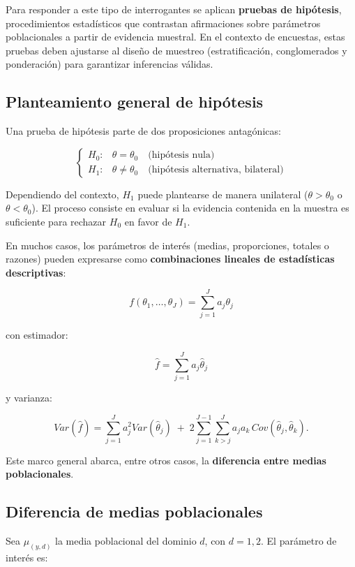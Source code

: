 \documentclass[
  spanish,
  12pt,
]{book}
\begin{document}
Para responder a este tipo de interrogantes se aplican \textbf{pruebas de hipótesis}, procedimientos estadísticos que contrastan afirmaciones sobre parámetros poblacionales a partir de evidencia muestral. En el contexto de encuestas, estas pruebas deben ajustarse al diseño de muestreo (estratificación, conglomerados y ponderación) para garantizar inferencias válidas.

\subsection{Planteamiento general de hipótesis}\label{planteamiento-general-de-hipuxf3tesis}

Una prueba de hipótesis parte de dos proposiciones antagónicas:

\[
\begin{cases}
H_{0}: & \theta = \theta_0 \quad \text{(hipótesis nula)} \\
H_{1}: & \theta \neq \theta_0 \quad \text{(hipótesis alternativa, bilateral)}
\end{cases}
\]

Dependiendo del contexto, \(H_1\) puede plantearse de manera unilateral (\(\theta > \theta_0\) o \(\theta < \theta_0\)). El proceso consiste en evaluar si la evidencia contenida en la muestra es suficiente para rechazar \(H_0\) en favor de \(H_1\).

En muchos casos, los parámetros de interés (medias, proporciones, totales o razones) pueden expresarse como \textbf{combinaciones lineales de estadísticas descriptivas}:

\[
f(\theta_1,\ldots,\theta_J) = \sum_{j=1}^J a_j \theta_j
\]

con estimador:

\[
\hat{f} = \sum_{j=1}^J a_j \hat{\theta}_j
\]

y varianza:

\[
Var(\hat{f}) = \sum_{j=1}^J a_j^2 Var(\hat{\theta}_j) \;+\; 2\sum_{j=1}^{J-1}\sum_{k>j}^J a_j a_k \, Cov(\hat{\theta}_j,\hat{\theta}_k).
\]

Este marco general abarca, entre otros casos, la \textbf{diferencia entre medias poblacionales}.

\subsection{Diferencia de medias poblacionales}\label{diferencia-de-medias-poblacionales}

Sea \(\mu_{(y,d)}\) la media poblacional del dominio \(d\), con \(d=1,2\). El parámetro de interés es:
\end{document}
